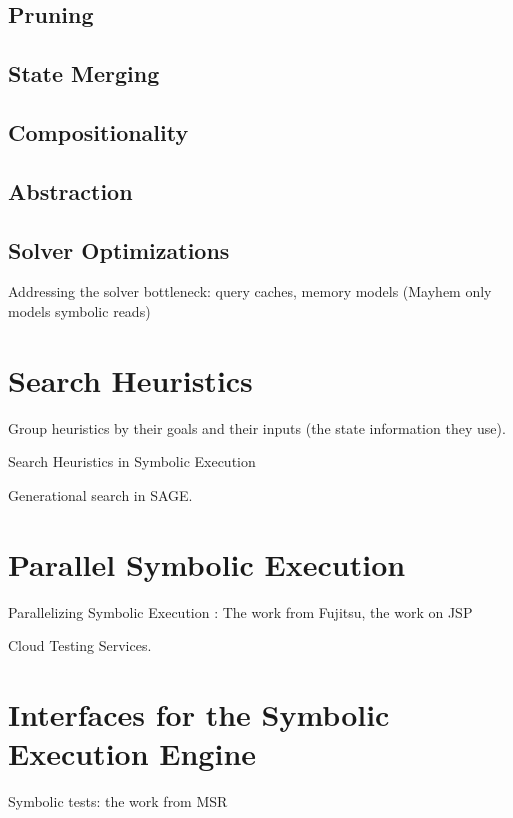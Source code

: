 \subsection{Pruning}

\subsection{State Merging}

\subsection{Compositionality}

\subsection{Abstraction}

\subsection{Solver Optimizations}

Addressing the solver bottleneck: query caches, memory models (Mayhem only models symbolic reads)


\section{Search Heuristics}
\label{sec:relwork:heuristics}

Group heuristics by their goals and their inputs (the state information they use).

Search Heuristics in Symbolic Execution

Generational search in SAGE.


\section{Parallel Symbolic Execution}
\label{sec:relwork:parallel}

Parallelizing Symbolic Execution : The work from Fujitsu, the work on JSP

Cloud Testing Services.


\section{Interfaces for the Symbolic Execution Engine}
\label{sec:relwork:ifaces}

Symbolic tests: the work from MSR


